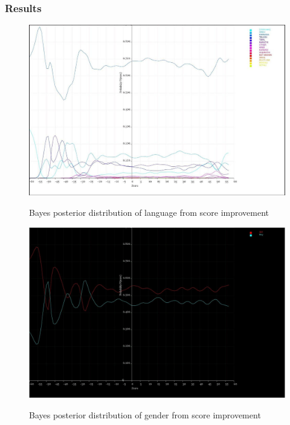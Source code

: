 \documentclass[10pt]{article}
\begin{document}
\subsubsection{Results}
\begin{figure}
\caption{Bayes posterior distribution of language from score improvement}
\label{BayesLanguageFromImprovement}
\begin{center}
\includegraphics[width=160mm]{ReportMedia/BayesLanguageFromImprovement.jpg}\\
\end{center}
\end{figure}
\begin{figure}
\caption{Bayes posterior distribution of gender from score improvement}
\label{BayesGenderFromImprovement}
\begin{center}
\includegraphics[width=160mm]{ReportMedia/BayesGenderFromImprovement.jpg}\\
\end{center}
\end{figure}
\end{document}
